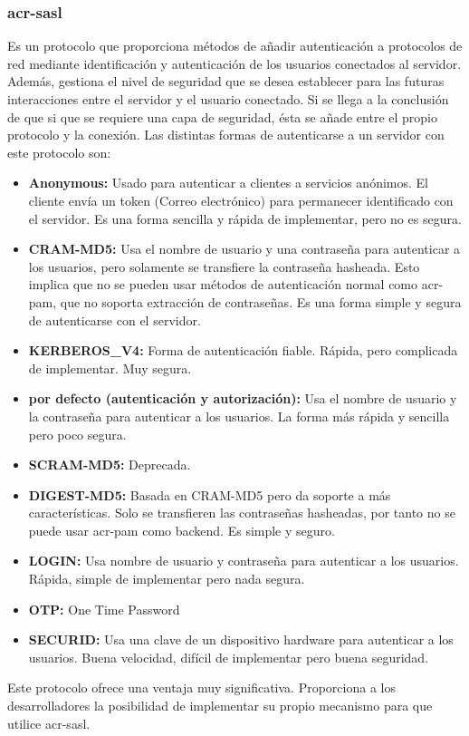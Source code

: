 \documentclass[twoside, titlepage, 12pt, a4paper]{article}
\begin{document}
\subsubsection{\gls{acr-sasl}}
Es un protocolo que proporciona métodos de añadir autenticación a protocolos de red mediante identificación y autenticación de los usuarios conectados al servidor. Además, gestiona el nivel de seguridad que se desea establecer para las futuras interacciones entre el servidor y el usuario conectado. Si se llega a la conclusión de que si que se requiere una capa de seguridad, ésta se añade entre el propio protocolo y la conexión.\cite{rfc2222} 
Las distintas formas de autenticarse a un servidor con este protocolo son:
\begin{itemize}
	\item{\textbf{Anonymous: }}Usado para autenticar a clientes a servicios anónimos. El cliente envía un token (Correo electrónico) para permanecer identificado con el servidor. Es una forma sencilla y rápida de implementar, pero no es segura.
	\item{\textbf{CRAM-MD5: }}Usa el nombre de usuario y una contraseña para autenticar a los usuarios, pero solamente se transfiere la contraseña hasheada. Esto implica que no se pueden usar métodos de autenticación normal como \gls{acr-pam}, que no soporta extracción de contraseñas. Es una forma simple y segura de autenticarse con el servidor.
	\item{\textbf{KERBEROS\_V4: }}Forma de autenticación fiable. Rápida, pero complicada de implementar. Muy segura.
	\item{\textbf{por defecto (autenticación y autorización): }}Usa el nombre de usuario y la contraseña para autenticar a los usuarios. La forma más rápida y sencilla pero poco segura.
	\item{\textbf{SCRAM-MD5: }}Deprecada.
	\item{\textbf{DIGEST-MD5: }}Basada en CRAM-MD5 pero da soporte a más características. Solo se transfieren las contraseñas hasheadas, por tanto no se puede usar \gls{acr-pam} como backend. Es simple y seguro.
	\item{\textbf{LOGIN: }}Usa nombre de usuario y contraseña para autenticar a los usuarios. Rápida, simple de implementar pero nada segura.
	\item{\textbf{OTP: }}One Time Password
	\item{\textbf{SECURID: }}Usa una clave de un dispositivo hardware para autenticar a los usuarios. Buena velocidad, difícil de implementar pero buena seguridad.
\end{itemize}
Este protocolo ofrece una ventaja muy significativa. Proporciona a los desarrolladores la posibilidad de implementar su propio mecanismo para que utilice \gls{acr-sasl}.
\end{document}
